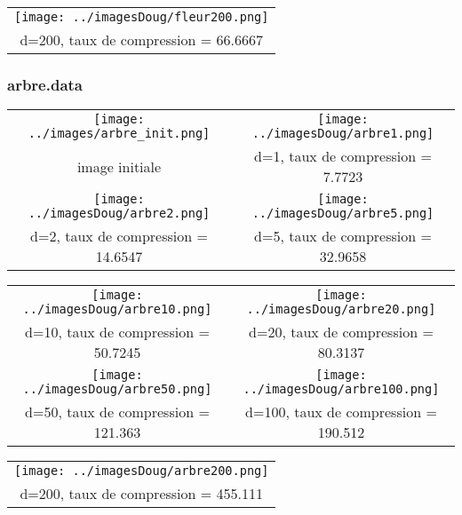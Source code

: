 \documentclass[11pt,a4paper]{article}
\begin{document}
\begin{center}
 \begin{tabular}{|c|}
  \hline
 \texttt{[image: ../imagesDoug/fleur200.png]} \\
d=200, taux de compression = 66.6667\\
\hline
 \end{tabular}
\end{center}


\subsubsection{arbre.data}

\begin{center}
 \begin{tabular}{|c|c|}
\hline
 \texttt{[image: ../images/arbre\_init.png]} & \texttt{[image: ../imagesDoug/arbre1.png]} \\
image initiale   &  d=1, taux de compression = 7.7723  \\
\hline
 \texttt{[image: ../imagesDoug/arbre2.png]} & \texttt{[image: ../imagesDoug/arbre5.png]} \\
d=2, taux de compression = 14.6547    &  d=5, taux de compression = 32.9658  \\
\hline
 \end{tabular}
 \end{center}

\begin{center}
 \begin{tabular}{|c|c|}
\hline
 \texttt{[image: ../imagesDoug/arbre10.png]} & \texttt{[image: ../imagesDoug/arbre20.png]} \\
d=10, taux de compression = 50.7245 &  d=20, taux de compression = 80.3137\\
\hline
 \texttt{[image: ../imagesDoug/arbre50.png]} & \texttt{[image: ../imagesDoug/arbre100.png]} \\
d=50, taux de compression = 121.363   &  d=100, taux de compression = 190.512  \\
\hline
 \end{tabular}
 \end{center}

\begin{center}
 \begin{tabular}{|c|}
  \hline
 \texttt{[image: ../imagesDoug/arbre200.png]} \\
d=200, taux de compression = 455.111\\
\hline
 \end{tabular}
\end{center}
\end{document}
